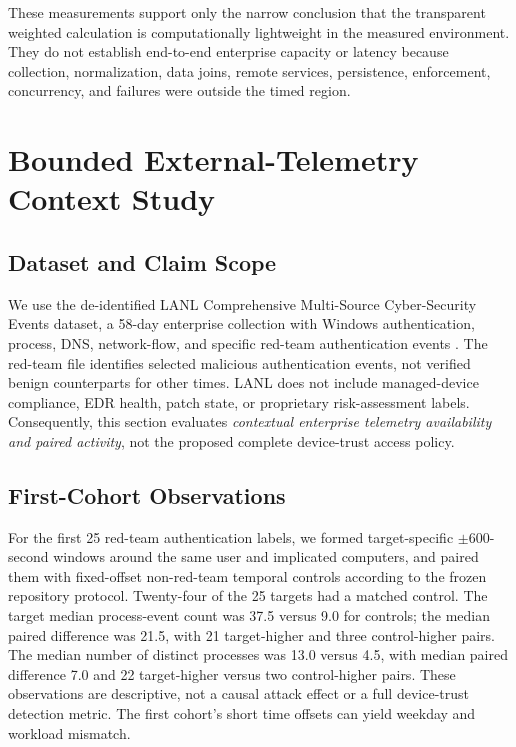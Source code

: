 \documentclass[journal]{IEEEtran}
\begin{document}
These measurements support only the narrow conclusion that the transparent weighted
calculation is computationally lightweight in the measured environment. They do not
establish end-to-end enterprise capacity or latency because collection, normalization,
data joins, remote services, persistence, enforcement, concurrency, and failures were
outside the timed region.


\section{Bounded External-Telemetry Context Study}
\subsection{Dataset and Claim Scope}
We use the de-identified LANL Comprehensive Multi-Source Cyber-Security
Events dataset, a 58-day enterprise collection with Windows authentication,
process, DNS, network-flow, and specific red-team authentication events
\cite{kent2015lanl}. The red-team file identifies selected malicious
authentication events, not verified benign counterparts for other times.
LANL does not include managed-device compliance, EDR health, patch state,
or proprietary risk-assessment labels. Consequently, this section evaluates
\emph{contextual enterprise telemetry availability and paired activity},
not the proposed complete device-trust access policy.

\subsection{First-Cohort Observations}
For the first 25 red-team authentication labels, we formed target-specific
$\pm600$-second windows around the same user and implicated computers, and
paired them with fixed-offset non-red-team temporal controls according to
the frozen repository protocol. Twenty-four of the 25 targets had a
matched control. The target median process-event count was 37.5 versus
9.0 for controls; the median paired difference was 21.5, with 21
target-higher and three control-higher pairs. The median number of distinct
processes was 13.0 versus 4.5, with median paired difference 7.0
and 22 target-higher versus two control-higher pairs. These observations
are descriptive, not a causal attack effect or a full device-trust
detection metric. The first cohort's short time offsets can yield
weekday and workload mismatch.
\end{document}
